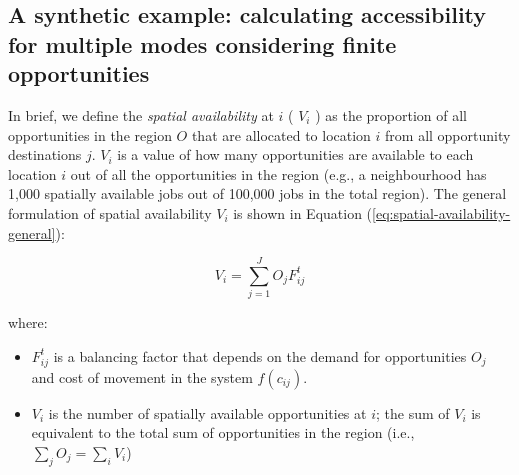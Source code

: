 \documentclass[numbered]{trbunofficial}
\providecommand{\tightlist}{%
  \setlength{\itemsep}{0pt}\setlength{\parskip}{0pt}}
\begin{document}
\hypertarget{a-synthetic-example-calculating-accessibility-for-multiple-modes-considering-finite-opportunities}{%
\subsection{A synthetic example: calculating accessibility for multiple
modes considering finite
opportunities}\label{a-synthetic-example-calculating-accessibility-for-multiple-modes-considering-finite-opportunities}}

In brief, we define the \emph{spatial availability} at \(i\) ( \(V_{i}\)
) as the proportion of all opportunities in the region \(O\) that are
allocated to location \(i\) from all opportunity destinations \(j\).
\(V_{i}\) is a value of how many opportunities are available to each
location \(i\) out of all the opportunities in the region (e.g., a
neighbourhood has 1,000 spatially available jobs out of 100,000 jobs in
the total region). The general formulation of spatial availability
\(V_{i}\) is shown in Equation (\ref{eq:spatial-availability-general}):

\begin{equation}
\label{eq:spatial-availability-general}
V_i = \sum_{j=1}^J O_jF^t_{ij}
\end{equation}

\noindent where:

\begin{itemize}
\tightlist
\item
  \(F^t_{ij}\) is a balancing factor that depends on the demand for
  opportunities \(O_j\) and cost of movement in the system
  \(f(c_{ij})\).
\item
  \(V_i\) is the number of spatially available opportunities at \(i\);
  the sum of \(V_{i}\) is equivalent to the total sum of opportunities
  in the region (i.e., \(\sum_j O_j = \sum_i V_i\))
\end{itemize}
\end{document}
